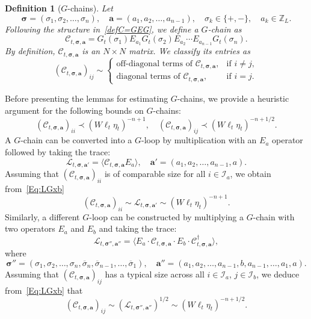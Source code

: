 \documentclass[10pt,reqno]{article}
\renewcommand{\bar}{\overline}
\theoremstyle{plain} %
\newtheorem{definition}[theorem]{Definition}
\theoremstyle{remark}
\numberwithin{equation}{section}
\begin{document}
\begin{definition}[$G$-chains]\label{def_Gchain}
Let 
\[
\boldsymbol{\sigma} = (\sigma_1, \sigma_2, \ldots, \sigma_n), \quad \mathbf{a} = (a_1, a_2, \ldots, a_{n-1}), \quad \sigma_k \in \{+, -\}, \quad a_k \in \mathbb{Z}_L.
\]
Following the structure in~\eqref{defC=GEG}, we define a \emph{$G$-chain} as
\begin{equation}
    \mathcal{C}_{t, \boldsymbol{\sigma}, \mathbf{a}} = G_t(\sigma_1) E_{a_1} G_t(\sigma_2) E_{a_2} \cdots E_{a_{n-1}} G_t(\sigma_n).
\end{equation}
By definition, $\mathcal{C}_{t, \boldsymbol{\sigma}, \mathbf{a}}$ is an \( N \times N \) matrix. We classify its entries as
\[
\left( \mathcal{C}_{t, \boldsymbol{\sigma}, \mathbf{a}} \right)_{ij} \sim 
\begin{cases}
    \text{off-diagonal terms of } \mathcal{C}_{t, \boldsymbol{\sigma}, \mathbf{a}}, & \text{if } i \neq j, \\ 
    \text{diagonal terms of } \mathcal{C}_{t, \boldsymbol{\sigma}, \mathbf{a}}, & \text{if } i = j.
\end{cases}
\]
\end{definition}

Before presenting the lemmas for estimating $G$-chains, we provide a heuristic argument for the following bounds on  $G$-chains:
\begin{equation}\label{res:heur_Chain}
    \left( \mathcal{C}_{t, \boldsymbol{\sigma}, \mathbf{a}} \right)_{ii} \prec (W\ell_t\eta_t)^{-n+1}, \quad 
    \left( \mathcal{C}_{t, \boldsymbol{\sigma}, \mathbf{a}} \right)_{ij} \prec (W\ell_t\eta_t)^{-n+1/2}.
\end{equation}
A $G$-chain can be converted into a $G$-loop by multiplication with an $E_a$ operator followed by taking the trace:
\[
\mathcal{L}_{t, \boldsymbol{\sigma}, \mathbf{a}'} = \langle \mathcal{C}_{t, \boldsymbol{\sigma}, \mathbf{a}} E_a \rangle, \quad \mathbf{a}' = (a_1, a_2, \ldots, a_{n-1}, a).
\]
Assuming that \( \left(\mathcal{C}_{t, \boldsymbol{\sigma}, \mathbf{a}}\right)_{ii} \) is of comparable size for all \( i \in \mathcal{I}_a \), we obtain from~\eqref{Eq:LGxb}
\[
\left(\mathcal{C}_{t, \boldsymbol{\sigma}, \mathbf{a}}\right)_{ii} \sim \mathcal{L}_{t, \boldsymbol{\sigma}, \mathbf{a}'} \sim (W\ell_t\eta_t)^{-n+1}.
\]
Similarly, a different $G$-loop can be constructed by multiplying a $G$-chain with two operators $E_a$ and $E_b$ and taking the trace:
\[
\mathcal{L}_{t, \boldsymbol{\sigma}'', \mathbf{a}''} = \langle E_a \cdot \mathcal{C}_{t, \boldsymbol{\sigma}, \mathbf{a}} \cdot E_b \cdot \mathcal{C}^\dagger_{t, \boldsymbol{\sigma}, \mathbf{a}} \rangle,
\]
where
\[
\boldsymbol{\sigma}'' = (\sigma_1, \sigma_2, \ldots, \sigma_n, \bar{\sigma}_n, \bar{\sigma}_{n-1}, \ldots, \bar{\sigma}_1), \quad 
\mathbf{a}'' = (a_1, a_2, \ldots, a_{n-1}, b, a_{n-1}, \ldots, a_1, a).
\]
Assuming that \( \left(\mathcal{C}_{t, \boldsymbol{\sigma}, \mathbf{a}}\right)_{ij} \) has a typical size across all \( i \in \mathcal{I}_a \), \( j \in \mathcal{I}_b \), we deduce from~\eqref{Eq:LGxb} that
\[
\left(\mathcal{C}_{t, \boldsymbol{\sigma}, \mathbf{a}}\right)_{ij} \sim \left( \mathcal{L}_{t, \boldsymbol{\sigma}'', \mathbf{a}''} \right)^{1/2} \sim (W\ell_t\eta_t)^{-n+1/2}.
\]
\end{document}
